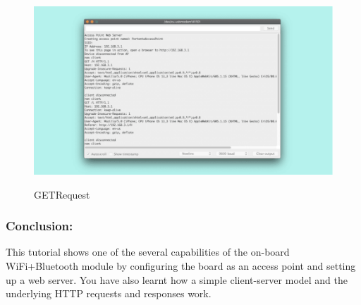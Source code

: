 \begin{itemize}
	\begin{figure}
		\begin{center}
			\includegraphics[width=0.7\linewidth]{Images/WIFI Module/GETRequest.png}
			\caption{GETRequest}
			\label{GETRequest} \cite{portentaWifiAccessPoint:2024}
		\end{center}
	\end{figure}
	
\end{itemize}

\subsubsection{Conclusion:}
This tutorial shows one of the several capabilities of the on-board WiFi+Bluetooth module by configuring the board as an access point and setting up a web server. You have also learnt how a simple client-server model and the underlying HTTP requests and responses work. \cite{portentaWifiAccessPoint:2024}




